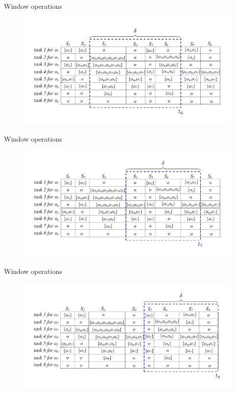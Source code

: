 \documentclass{beamer}
\begin{document}
\begin{frame}{Window operations}
    \centering
    \begin{figure}
        \includegraphics[width=.9\textwidth]{figures/Window03}
    \end{figure}    
\end{frame}
\begin{frame}{Window operations}
    \centering
    \begin{figure}
        \includegraphics[width=.9\textwidth]{figures/Window04}
    \end{figure}    
\end{frame}
\begin{frame}{Window operations}
    \centering
    \begin{figure}
        \includegraphics[width=.9\textwidth]{figures/Window05}
    \end{figure}    
\end{frame}
\end{document}

